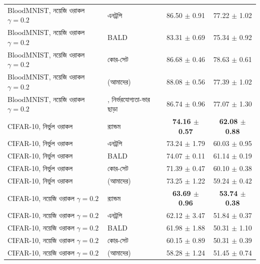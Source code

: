 \begin{tabular}{llcc}
BloodMNIST, নয়েজি ওরাকল $\gamma{=}0.2$ & এনট্রপি & 86.50 $\pm$ 0.91 & 77.22 $\pm$ 1.02 \\
BloodMNIST, নয়েজি ওরাকল $\gamma{=}0.2$ & BALD & 83.31 $\pm$ 0.69 & 75.34 $\pm$ 0.92 \\
BloodMNIST, নয়েজি ওরাকল $\gamma{=}0.2$ & কোর-সেট & 86.68 $\pm$ 0.46 & 78.63 $\pm$ 0.61 \\
BloodMNIST, নয়েজি ওরাকল $\gamma{=}0.2$ & \method{} (আমাদের) & 88.08 $\pm$ 0.56 & 77.39 $\pm$ 1.02 \\
BloodMNIST, নয়েজি ওরাকল $\gamma{=}0.2$ & \method{}, নির্ভরযোগ্যতা-ভার ছাড়া & 86.74 $\pm$ 0.96 & 77.07 $\pm$ 1.30 \\
\midrule
CIFAR-10, নির্ভুল ওরাকল & র‍্যান্ডম & \textbf{74.16 $\pm$ 0.57} & \textbf{62.08 $\pm$ 0.88} \\
CIFAR-10, নির্ভুল ওরাকল & এনট্রপি & 73.24 $\pm$ 1.79 & 60.03 $\pm$ 0.95 \\
CIFAR-10, নির্ভুল ওরাকল & BALD & 74.07 $\pm$ 0.11 & 61.14 $\pm$ 0.19 \\
CIFAR-10, নির্ভুল ওরাকল & কোর-সেট & 71.39 $\pm$ 0.47 & 60.10 $\pm$ 0.38 \\
CIFAR-10, নির্ভুল ওরাকল & \method{} (আমাদের) & 73.25 $\pm$ 1.22 & 59.24 $\pm$ 0.42 \\
\midrule
CIFAR-10, নয়েজি ওরাকল $\gamma{=}0.2$ & র‍্যান্ডম & \textbf{63.69 $\pm$ 0.96} & \textbf{53.74 $\pm$ 0.38} \\
CIFAR-10, নয়েজি ওরাকল $\gamma{=}0.2$ & এনট্রপি & 62.12 $\pm$ 3.47 & 51.84 $\pm$ 0.37 \\
CIFAR-10, নয়েজি ওরাকল $\gamma{=}0.2$ & BALD & 61.98 $\pm$ 1.88 & 50.31 $\pm$ 1.10 \\
CIFAR-10, নয়েজি ওরাকল $\gamma{=}0.2$ & কোর-সেট & 60.15 $\pm$ 0.89 & 50.31 $\pm$ 0.39 \\
CIFAR-10, নয়েজি ওরাকল $\gamma{=}0.2$ & \method{} (আমাদের) & 58.28 $\pm$ 1.24 & 51.45 $\pm$ 0.74 \\
\bottomrule
\end{tabular}
